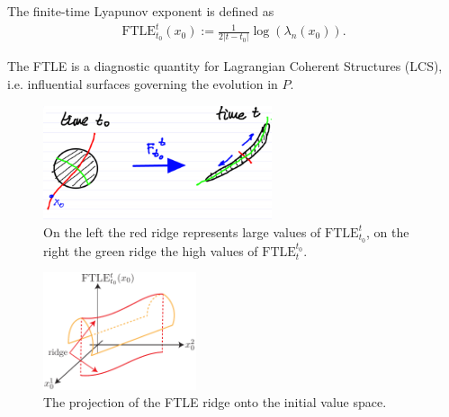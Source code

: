 \begin{definition}
	The finite-time Lyapunov exponent is defined as
	\begin{align}
		\boxed{ \textrm{FTLE} _{t_0}^{t}( {x}_0) := \frac{1}{2|t-t_0|} \log(\lambda_n( {x}_0)).}
	\end{align}
\end{definition}
The FTLE is a diagnostic quantity for Lagrangian Coherent Structures (LCS), i.e. influential surfaces governing the evolution in $P$.
\begin{figure}[h!]
	\centering
	\includegraphics[width=0.6\textwidth]{figures/ch1/9deformation.png}
	\caption{On the left the red ridge represents large values of $ \textrm{FTLE} _{t_0}^{t}$, on the right the green ridge the high values of $ \textrm{FTLE} _{t}^{t_0}$.}
	\label{fig:FTLE_ridges}
\end{figure}
\begin{figure}[h!]
	\centering
	\includegraphics[width=0.4\textwidth]{figures/ch1/10ridge_projection}
	\caption{The projection of the FTLE ridge onto the initial value space.}
	\label{fig:FTLE_surface}
\end{figure}

